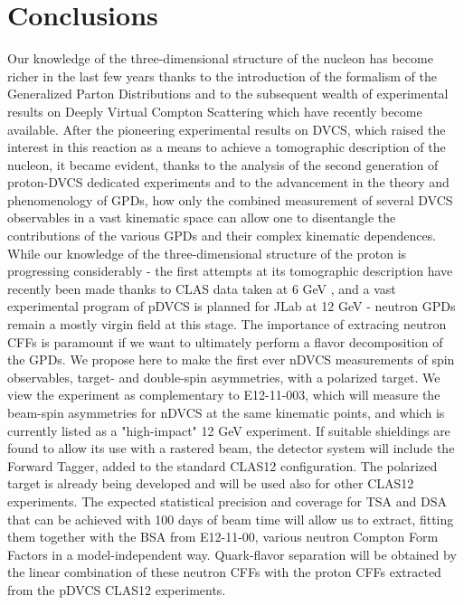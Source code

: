 \section{Conclusions}
Our knowledge of the three-dimensional structure of the nucleon has become richer in the last few years thanks to the introduction of the formalism of the Generalized Parton Distributions and to the subsequent wealth of experimental results on Deeply Virtual Compton Scattering which have recently become available. After the pioneering experimental results on DVCS, which raised the interest in this reaction as a means to achieve a tomographic description of the nucleon, it became evident, thanks to the analysis of the second generation of proton-DVCS dedicated experiments and to the advancement in the theory and phenomenology of GPDs, how only the combined measurement of several DVCS observables in a vast kinematic space can allow one to disentangle the contributions of the various GPDs and their complex kinematic dependences. While our knowledge of the three-dimensional structure of the proton is progressing considerably - the first attempts at its tomographic description have recently been made thanks to CLAS data taken at 6 GeV \cite{pisano,hs}, and a vast experimental program of pDVCS is planned for JLab at 12 GeV - neutron GPDs remain a mostly virgin field at this stage. The importance of extracing neutron CFFs is paramount if we want to ultimately perform a flavor decomposition of the GPDs. 
We propose here to make the first ever nDVCS measurements of spin observables, target- and double-spin asymmetries, with a polarized target.  We view the experiment as complementary to E12-11-003, which will measure the beam-spin asymmetries for nDVCS at the same kinematic points, and which is currently listed as a "high-impact" 12 GeV experiment. 
If suitable shieldings are found to allow its use with a rastered beam, the detector system will include the Forward Tagger, added to the standard CLAS12 configuration. The polarized target is already being developed and will be used also for other CLAS12 experiments. The expected statistical precision and coverage for TSA and DSA that can be achieved with 100 days of beam time will allow us to extract, fitting them together with the BSA from E12-11-00, various neutron Compton Form Factors in a model-independent way. Quark-flavor separation will be obtained by the linear combination of these neutron CFFs with the proton CFFs extracted from the pDVCS CLAS12 experiments. 

